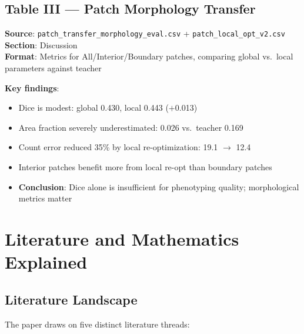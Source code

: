 \documentclass[11pt,a4paper]{article}
\newcommand{\filepath}[1]{\texttt{\small #1}}
\begin{document}
\subsection{Table III --- Patch Morphology Transfer}
\textbf{Source}: \filepath{patch\_transfer\_morphology\_eval.csv} + \filepath{patch\_local\_opt\_v2.csv}\\
\textbf{Section}: Discussion\\
\textbf{Format}: Metrics for All/Interior/Boundary patches, comparing global vs.\ local parameters against teacher

\textbf{Key findings}:
\begin{itemize}[nosep]
  \item Dice is modest: global 0.430, local 0.443 ($+$0.013)
  \item Area fraction severely underestimated: 0.026 vs.\ teacher 0.169
  \item Count error reduced 35\% by local re-optimization: 19.1 $\to$ 12.4
  \item Interior patches benefit more from local re-opt than boundary patches
  \item \textbf{Conclusion}: Dice alone is insufficient for phenotyping quality; morphological metrics matter
\end{itemize}

\section{Literature and Mathematics Explained}

\subsection{Literature Landscape}

The paper draws on five distinct literature threads:
\end{document}
